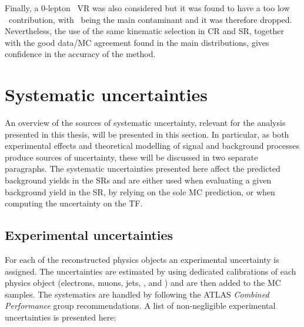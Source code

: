 		Finally, a $0$-lepton \ttgamma\ \ac{VR} was also considered but it was found to have a too low \ttgamma\ contribution, with \gammajets\ being the main contaminant and it was therefore dropped. Nevertheless, the use of the same kinematic selection in \ac{CR}  and \ac{SR}, together with the good data/\ac{MC} agreement found in the main distributions, gives confidence in the accuracy of the method.



	\section{Systematic uncertainties}
	\label{sec:syst_unc}

		An overview of the sources of systematic uncertainty, relevant for the analysis presented in this thesis, will be presented in this section. In particular, as both experimental effects and theoretical modelling of signal and background processes produce sources of uncertainty, these will be discussed in two separate paragraphs. The systematic uncertainties presented here affect the predicted background yields in the \acp{SR} and are either used when evaluating a given background yield in the \ac{SR}, by relying on the sole \ac{MC} prediction, or when computing the uncertainty on the \ac{TF}.%


		\subsection{Experimental uncertainties}
			
			For each of the reconstructed physics objects an experimental uncertainty is assigned. The uncertainties are estimated by using dedicated calibrations of each physics object (electrons, muons, jets, \bjs, and \met) and are then added to the \ac{MC} samples. The systematics are handled by following the ATLAS \emph{Combined Performance} group recommendations. A list of non-negligible experimental uncertainties is presented here:

